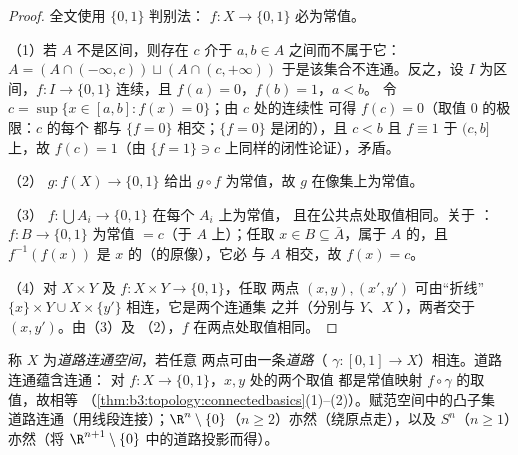 \begin{proof}
全文使用 $\{0,1\}$ 判别法： $f \colon X \to
\{0,1\}$ 必为常值。

（1）若 $A$ 不是区间，则存在 $c$ 介于 $a, b \in A$ 之间而不属于它：
$A = (A \cap (-\infty, c)) \sqcup (A \cap (c, +\infty))$
于是该集合不连通。反之，设 $I$ 为区间，$f \colon I
\to \{0,1\}$ 连续，且 $f(a) = 0$，$f(b) = 1$，$a < b$。
令 $c = \sup\{x \in [a,b] : f(x) = 0\}$；由 $c$ 处的连续性
可得 $f(c) = 0$（取值 $0$ 的极限：$c$ 的每个
都与 $\{f = 0\}$ 相交；$\{f=0\}$ 是闭的），且 $c < b$
且 $f \equiv 1$ 于 $(c, b]$ 上，故 $f(c) = 1$（由
$\{f = 1\} \ni c$ 上同样的闭性论证），矛盾。

（2） $g \colon f(X) \to \{0,1\}$ 给出 $g \circ f$
为常值，故 $g$ 在像集上为常值。

（3） $f\colon \bigcup A_i \to \{0,1\}$ 在每个 $A_i$ 上为常值，
且在公共点处取值相同。关于
：$f \colon B \to \{0,1\}$ 为常值 $= c$（于 $A$ 上）；任取
$x \in B \subseteq \bar A$，属于 $A$ 的，且 $f^{-1}
(f(x))$ 是 $x$ 的（的原像），它必
与 $A$ 相交，故 $f(x) = c$。

（4）对 $X \times Y$ 及 $f\colon X\times Y \to \{0,1\}$，任取
两点 $(x,y), (x',y')$ 可由“折线”
$\{x\}\times Y \cup X \times \{y'\}$ 相连，它是两个连通集
之并（分别与 $Y$、$X$ ），两者交于 $(x, y')$。由（3）及
（2），$f$ 在两点处取值相同。
\end{proof}

\begin{definition}\label{def:b3:topology:pathconnected}
称 $X$ 为\emph{道路连通空间}，若任意
两点可由一条\emph{道路}（ $\gamma
\colon [0,1] \to X$）相连。道路连通蕴含连通：
对 $f \colon X \to \{0,1\}$，$x, y$ 处的两个取值
都是常值映射 $f\circ\gamma$ 的取值，故相等
（\cref{thm:b3:topology:connectedbasics}(1)--(2)）。赋范空间中的凸子集
道路连通（用线段连接）；$\R^n
\setminus \{0\}$（$n \geq 2$）亦然（绕原点走），以及
$S^n$（$n \geq 1$）亦然（将 $\R^{n+1}\setminus
\{0\}$ 中的道路投影而得）。
\end{definition}

